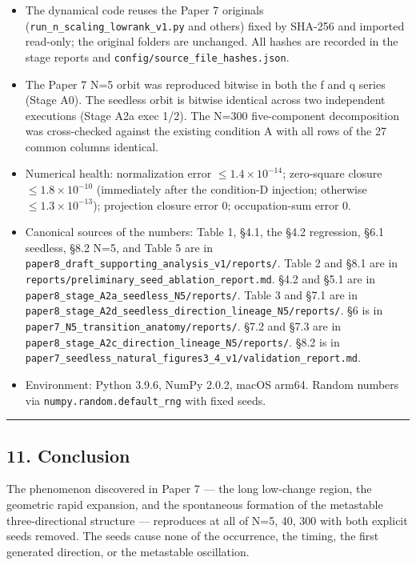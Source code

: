 \documentclass[
  a4paper,
]{article}
\newcounter{none} %
\providecommand{\tightlist}{%
  \setlength{\itemsep}{0pt}\setlength{\parskip}{0pt}}
\begin{document}
\begin{itemize}
\tightlist
\item
  The dynamical code reuses the Paper 7 originals
  (\texttt{run\_n\_scaling\_lowrank\_v1.py} and others) fixed by SHA-256
  and imported read-only; the original folders are unchanged. All hashes
  are recorded in the stage reports and
  \texttt{config/source\_file\_hashes.json}.
\item
  The Paper 7 N=5 orbit was reproduced bitwise in both the f and q
  series (Stage A0). The seedless orbit is bitwise identical across two
  independent executions (Stage A2a exec 1/2). The N=300 five-component
  decomposition was cross-checked against the existing condition A with
  all rows of the 27 common columns identical.
\item
  Numerical health: normalization error \(\le1.4\times10^{-14}\);
  zero-square closure \(\le1.8\times10^{-10}\) (immediately after the
  condition-D injection; otherwise \(\le1.3\times10^{-13}\)); projection
  closure error 0; occupation-sum error 0.
\item
  Canonical sources of the numbers: Table 1, §4.1, the §4.2 regression,
  §6.1 seedless, §8.2 N=5, and Table 5 are in
  \texttt{paper8\_draft\_supporting\_analysis\_v1/reports/}. Table 2 and
  §8.1 are in \texttt{reports/preliminary\_seed\_ablation\_report.md}.
  §4.2 and §5.1 are in
  \texttt{paper8\_stage\_A2a\_seedless\_N5/reports/}. Table 3 and §7.1
  are in
  \texttt{paper8\_stage\_A2d\_seedless\_direction\_lineage\_N5/reports/}.
  §6 is in \texttt{paper7\_N5\_transition\_anatomy/reports/}. §7.2 and
  §7.3 are in
  \texttt{paper8\_stage\_A2c\_direction\_lineage\_N5/reports/}. §8.2 is
  in
  \texttt{paper7\_seedless\_natural\_figures3\_4\_v1/validation\_report.md}.
\item
  Environment: Python 3.9.6, NumPy 2.0.2, macOS arm64. Random numbers
  via \texttt{numpy.random.default\_rng} with fixed seeds.
\end{itemize}

\begin{center}\rule{0.5\linewidth}{0.5pt}\end{center}

\subsection{11. Conclusion}\label{conclusion}

The phenomenon discovered in Paper 7 --- the long low-change region, the
geometric rapid expansion, and the spontaneous formation of the
metastable three-directional structure --- reproduces at all of N=5, 40,
300 with both explicit seeds removed. The seeds cause none of the
occurrence, the timing, the first generated direction, or the metastable
oscillation.
\end{document}
